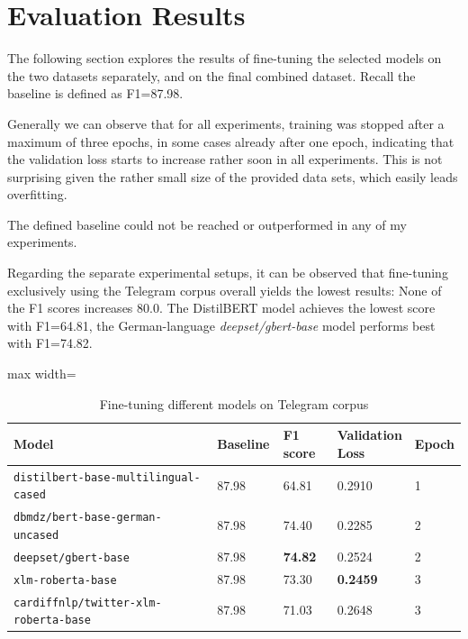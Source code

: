 \section{Evaluation Results}
The following section explores the results of fine-tuning the selected models on the two datasets separately, and on the final combined dataset. Recall the baseline is defined as F1=87.98. 

Generally we can observe that for all experiments, training was stopped after a maximum of three epochs, in some cases already after one epoch, indicating that the validation loss starts to increase rather soon in all experiments.  This is not surprising given the rather small size of the provided data sets, which easily leads overfitting. 

The defined baseline could not be reached or outperformed in any of my experiments.

Regarding the separate experimental setups, it can be observed that fine-tuning exclusively using the Telegram corpus overall yields the lowest results: None of the F1 scores increases 80.0. The DistilBERT model achieves the lowest score with F1=64.81,  the German-language \textit{deepset/gbert-base} model performs best with F1=74.82. 

\begin{table}[htp]
\caption{Fine-tuning different models on Telegram corpus}
\label{tab:experiments_tg}
\centering
\begin{adjustbox}{max width=\textwidth}
\begin{tabular}{|p{0.7\linewidth}|p{0.15\linewidth}|p{0.15\linewidth}|p{0.15\linewidth}|p{0.15\linewidth}|}
\hline 
\textbf{Model} & \textbf{Baseline} &\textbf{F1 score} & \textbf{Validation Loss}& \textbf{Epoch}\\ \hline 
\verb|distilbert-base-multilingual-cased| & 87.98 & 64.81 & 0.2910 & 1\\ \hline
\verb|dbmdz/bert-base-german-uncased| & 87.98 & 74.40 & 0.2285 & 2 \\ \hline
\verb|deepset/gbert-base| & 87.98 & \textbf{74.82} & 0.2524 & 2 \\ \hline
\verb|xlm-roberta-base| & 87.98 & 73.30 & \textbf{0.2459} & 3 \\ \hline
\verb|cardiffnlp/twitter-xlm-roberta-base| &  87.98 & 71.03 & 0.2648 & 3 \\ \hline
\end{tabular}
\end{adjustbox}
\end{table}

